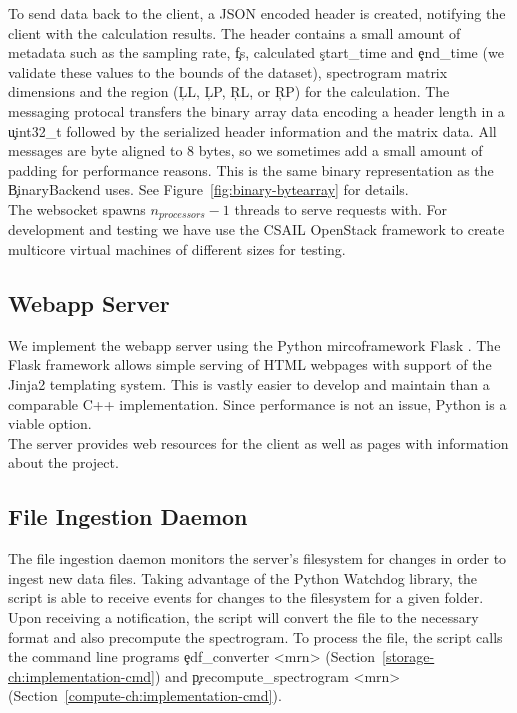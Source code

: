 To send data back to the client, a JSON encoded header is created, notifying
the client with the calculation results. The header contains a small amount of
metadata such as the sampling rate, \c{fs}, calculated \c{start\_time} and
\c{end\_time} (we validate these values to the bounds of the dataset),
spectrogram matrix dimensions and the region (\c{LL}, \c{LP}, \c{RL}, or
\c{RP}) for the calculation.  The messaging protocal transfers the binary array
data encoding a header length in a \c{uint32\_t} followed by the serialized
header information and the matrix data. All messages are byte aligned to 8
bytes, so we sometimes add a small amount of padding for performance reasons.
This is the same binary representation as the \c{BinaryBackend} uses. See
Figure~\ref{fig:binary-bytearray} for details.\\

The websocket spawns $n_{processors} - 1$ threads to serve requests with. For
development and testing we have use the CSAIL OpenStack framework to create
multicore virtual machines of different sizes for testing.

\subsection{Webapp Server}\label{compute-ch:implementation-webapp}

We implement the webapp server using the Python mircoframework Flask
\cite{flask}. The Flask framework allows simple serving of HTML webpages with
support of the Jinja2 \cite{jinja2} templating system. This is vastly easier to
develop and maintain than a comparable C++ implementation. Since performance is
not an issue, Python is a viable option. \\

The server provides web resources for the client as well as pages with
information about the project.

\subsection{File Ingestion Daemon}

The file ingestion daemon monitors the server's filesystem for changes in order
to ingest new data files. Taking advantage of the Python Watchdog
\cite{watchdog} library, the script is able to receive events for changes to
the filesystem for a given folder. Upon receiving a notification, the script
will convert the file to the necessary format and also precompute the
spectrogram. To process the file, the script calls the command line programs
\c{edf\_converter <mrn>} (Section~\ref{storage-ch:implementation-cmd}) and
\c{precompute\_spectrogram <mrn>}
(Section~\ref{compute-ch:implementation-cmd}). \\

